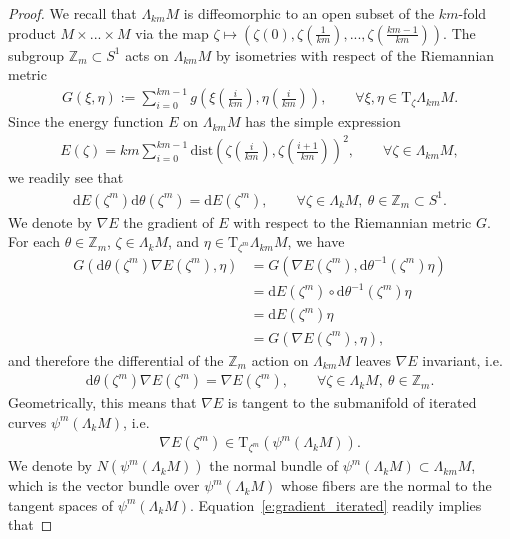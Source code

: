 \documentclass[reqno]{amsart}
\numberwithin{equation}{section}
\theoremstyle{personal}%
\theoremstyle{definition}
\newcommand{\Z}{\mathds{Z}}
\newcommand{\diff}{\mathrm{d}}
\newcommand{\dist}{\mathrm{dist}}
\newcommand{\Tan}{\mathrm{T}}
\begin{document}
\begin{proof}
We recall that $\Lambda_{km}M$ is diffeomorphic to an open subset of the $km$-fold product $M\times...\times M$ via the map $\zeta\mapsto(\zeta(0),\zeta(\tfrac {1}{km}),...,\zeta(\tfrac{km-1}{km}))$. The subgroup $\Z_m\subset S^1$ acts on $\Lambda_{km}M$ by isometries with respect of the Riemannian metric
\begin{align*}
G(\xi,\eta):=\sum_{i=0}^{km-1} g(\xi(\tfrac{i}{km}),\eta(\tfrac{i}{km})),
\qquad
\forall \xi,\eta\in\Tan_{\zeta}\Lambda_{km}M.
\end{align*}
Since the energy function $E$ on $\Lambda_{km}M$ has the simple expression
\begin{align*}
E(\zeta) = km \sum_{i=0}^{km-1} \dist(\zeta(\tfrac{i}{km}),\zeta(\tfrac{i+1}{km}))^2,
\qquad\forall \zeta\in\Lambda_{km}M,
\end{align*}
we readily see that 
\begin{align*}
\diff E(\zeta^m)\diff\theta(\zeta^m)=\diff E(\zeta^m),
\qquad
\forall\zeta\in\Lambda_kM,\ \theta\in\Z_m\subset S^1. 
\end{align*}
We denote by $\nabla E$ the gradient of $E$ with respect to the Riemannian metric $G$. For each $\theta\in\Z_m$, $\zeta\in\Lambda_kM$, and $\eta\in\Tan_{\zeta^m}\Lambda_{km}M$, we have
\begin{align*}
G(\diff\theta(\zeta^m)\nabla E(\zeta^m),\eta)
&=
G(\nabla E(\zeta^m),\diff\theta^{-1}(\zeta^m)\eta)\\
&=
\diff E(\zeta^m)\circ \diff\theta^{-1}(\zeta^m)\eta\\
&=
\diff E(\zeta^m)\eta\\
&=
G(\nabla E(\zeta^m),\eta),
\end{align*}
and therefore the differential of the $\Z_m$ action on $\Lambda_{km}M$ leaves $\nabla E$ invariant, i.e.
\begin{align*}
 \diff\theta(\zeta^m)\nabla E(\zeta^m)=\nabla E(\zeta^m),
 \qquad
 \forall\zeta\in\Lambda_kM,\ \theta\in\Z_m.
\end{align*}
Geometrically, this means that  $\nabla E$ is tangent to the submanifold of iterated curves $\psi^m(\Lambda_kM)$, i.e.
\begin{align}
\label{e:gradient_iterated}
 \nabla E(\zeta^m)\in\Tan_{\zeta^m}(\psi^m(\Lambda_kM)).
\end{align}
We denote by $N(\psi^m(\Lambda_kM))$ the normal bundle of $\psi^m(\Lambda_kM)\subset\Lambda_{km}M$, which is the vector bundle over $\psi^m(\Lambda_kM)$ whose fibers are the normal to the tangent spaces of $\psi^m(\Lambda_kM)$. Equation~\eqref{e:gradient_iterated} readily implies that

\end{proof}
\end{document}
